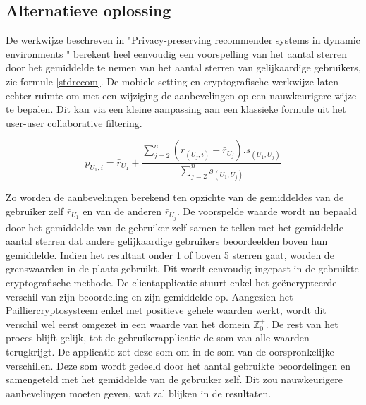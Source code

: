 \subsection{Alternatieve oplossing}
De werkwijze beschreven in "Privacy-preserving recommender systems in dynamic environments \cite{ZErkinDyn}" berekent heel eenvoudig een voorspelling van het aantal sterren door het gemiddelde te nemen van het aantal sterren van gelijkaardige gebruikers, zie formule \ref{stdrecom}. De mobiele setting en cryptografische werkwijze laten echter ruimte om met een wijziging de aanbevelingen op een nauwkeurigere wijze te bepalen. Dit kan via een kleine aanpassing aan een klassieke formule uit het user-user collaborative filtering.

\begin{equation}\label{stdrecom}p_{U_1,i} = \bar{r}_{U_1} + \frac{\sum_{j=2}^{n}(r_{(U_j,i)} - \bar{r}_{U_j}).s_{(U_1,U_j)}}{\sum_{j=2}^{n} s_{(U_1,U_j)}}
\end{equation}

Zo worden de aanbevelingen berekend ten opzichte van de gemiddeldes van de gebruiker zelf $\bar{r}_{U_1}$ en van de anderen $\bar{r}_{U_j}$. De voorspelde waarde wordt nu bepaald door het gemiddelde van de gebruiker zelf samen te tellen met het gemiddelde aantal sterren dat andere gelijkaardige gebruikers beoordeelden boven hun gemiddelde. Indien het resultaat onder 1 of boven 5 sterren gaat, worden de grenswaarden in de plaats gebruikt.
Dit wordt eenvoudig ingepast in de gebruikte cryptografische methode. De clientapplicatie stuurt enkel het ge\"encrypteerde verschil van zijn beoordeling en zijn gemiddelde op. Aangezien het Pailliercryptosysteem enkel met positieve gehele waarden werkt, wordt dit verschil wel eerst omgezet in een waarde van het domein $\mathbb{Z}^{+}_{0}$. De rest van het proces blijft gelijk, tot de gebruikerapplicatie de som van alle waarden terugkrijgt. De applicatie zet deze som om in de som van de oorspronkelijke verschillen. Deze som wordt gedeeld door het aantal gebruikte beoordelingen en samengeteld met het gemiddelde van de gebruiker zelf. Dit zou nauwkeurigere aanbevelingen moeten geven, wat zal blijken in de resultaten.